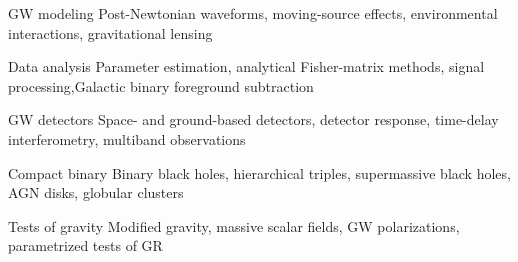 

\begin{cvskills}

  \cvskill
    {GW modeling} %
    {Post-Newtonian waveforms, moving-source effects, environmental interactions, gravitational lensing} %

  \cvskill
    {Data analysis} %
    {Parameter estimation, analytical Fisher-matrix methods, signal processing,\newline Galactic binary foreground subtraction} %

  \cvskill
    {GW detectors} %
    {Space- and ground-based detectors, detector response, time-delay interferometry, multiband observations} %

  \cvskill
    {Compact binary} %
    {Binary black holes, hierarchical triples, supermassive black holes, AGN disks, globular clusters} %

  \cvskill
    {Tests of gravity} %
    {Modified gravity, massive scalar fields, GW polarizations, parametrized tests of GR} %


\end{cvskills}
